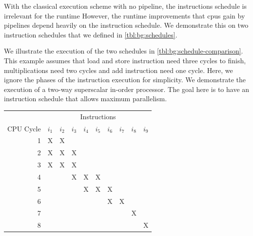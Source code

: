With the classical execution scheme with no pipeline, the instructions schedule is irrelevant for the runtime
However, the runtime improvements that \acp{cpu} gain by pipelines depend heavily on the instruction schedule.
We demonstrate this on two instruction schedules that we defined in \cref{tbl:bg:schedules}.

We illustrate the execution of the two schedules in \cref{tbl:bg:schedule-comparison}.
This example assumes that load and store instruction need three cycles to finish, multiplications need two cycles and add instruction need one cycle.
Here, we ignore the phases of the instruction execution for simplicity.
We demonstrate the execution of a two-way superscalar in-order processor.
The goal here is to have an instruction schedule that allows maximum parallelism.
\begin{table}
    \scriptsize
    \begin{subtable}{0.48\textwidth}
        \begin{tabular}{rccccccccc} \toprule
            & \multicolumn{9}{c}{\fontsize{11pt}{9pt}\selectfont Instructions} \\
            \cmidrule{2-10}
            {\fontsize{11pt}{9pt}\selectfont CPU Cycle} & 
            {\fontsize{11pt}{9pt}\selectfont $i_1$} & 
            {\fontsize{11pt}{9pt}\selectfont $i_2$} & 
            {\fontsize{11pt}{9pt}\selectfont $i_3$} & 
            {\fontsize{11pt}{9pt}\selectfont $i_4$} & 
            {\fontsize{11pt}{9pt}\selectfont $i_5$} & 
            {\fontsize{11pt}{9pt}\selectfont $i_6$} & 
            {\fontsize{11pt}{9pt}\selectfont $i_7$} & 
            {\fontsize{11pt}{9pt}\selectfont $i_8$} & 
            {\fontsize{11pt}{9pt}\selectfont $i_9$} \\
            \midrule
             1 & X & X &   &   &   &   &   &   &   \\ \rowcolor[gray]{.975}
             2 & X & X & X &   &   &   &   &   &   \\
             3 & X & X & X &   &   &   &   &   &   \\ \rowcolor[gray]{.975}
             4 &   &   & X & X & X &   &   &   &   \\
             5 &   &   &   & X & X & X &   &   &   \\ \rowcolor[gray]{.975}
             6 &   &   &   &   &   & X & X &   &   \\
             7 &   &   &   &   &   &   &   & X &   \\ \rowcolor[gray]{.975}
             8 &   &   &   &   &   &   &   &   & X \\

\end{tabular}
\end{subtable}
\end{table}
